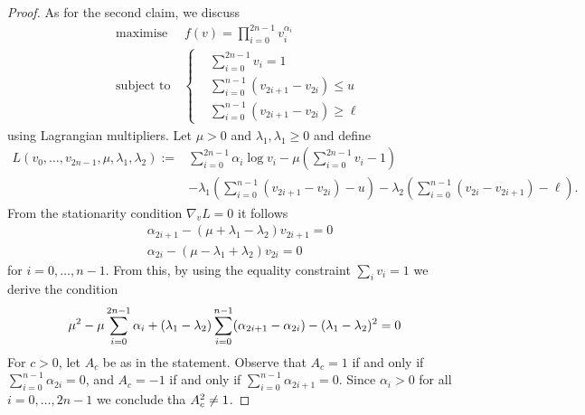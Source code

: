 \documentclass[10pt, article,table]{article}
\begin{document}
\begin{proof}
As for the second claim, we discuss 
\begin{equation*}
 \begin{split}
  &
  \text{maximise }\quad f(v)=\prod_{i=0}^{2n-1}v_{i}^{\alpha_i}
  \\
  &
  \text{subject to}\quad 
  \begin{cases}
   &
   \sum_{i=0}^{2n-1} v_i = 1
   \\
   &
   \sum_{i=0}^{n-1}(v_{2i+1}-v_{2i}) \leq u
   \\
   &
   \sum_{i=0}^{n-1}(v_{2i+1}-v_{2i}) \geq \ell
  \end{cases}
 \end{split}
\end{equation*}
using Lagrangian multipliers. Let $\mu > 0 $ and $\lambda_1, \lambda_1 \geq 0$ and define
\begin{equation*}
 \begin{split}
  L(v_0,\dots,v_{2n-1},\mu,\lambda_1,\lambda_2)
  :=
  &
  \sum_{i=0}^{2n-1} \alpha_{i}\log v_{i} - \mu \left(\sum_{i=0}^{2n-1} v_{i} -1\right)
  \\
  &
  -\lambda_1\left(\sum_{i=0}^{n-1}(v_{2i+1}-v_{2i}) - u\right)
  -\lambda_2\left(\sum_{i=0}^{n-1}(v_{2i}-v_{2i+1}) - \ell\right). 
 \end{split}
\end{equation*}
From the stationarity condition $\nabla_{v} L =0$ it follows
\begin{equation}\label{eq.conditionLagrangianPnt}
 \begin{split}
  &
  \alpha_{2i+1} - (\mu+\lambda_1 - \lambda_2)v_{2i+1} = 0
  \\
  &
  \alpha_{2i} - (\mu - \lambda_1 + \lambda_2)v_{2i} = 0
 \end{split}
\end{equation}
for $i=0,\dots,n-1$. From this, by using the equality constraint $\sum_i v_i = 1$ we derive the condition 
\begin{equation}\label{eq.conditionLagrangianMultipl}
 \mu\squared - \mu \sum_{i=0}^{2n-1}\alpha_i 
 +(\lambda_1-\lambda_2)\sum_{i=0}^{n-1}(\alpha_{2i+1}-\alpha_{2i})
 -(\lambda_1-\lambda_2)\squared=0
\end{equation}
For $c>0$, let $A_c$ be as in the statement. Observe that $A_c =1$ if and only if $\sum_{i=0}^{n-1}\alpha_{2i} =0$, and $A_c =-1$ if and only if $\sum_{i=0}^{n-1}\alpha_{2i+1} =0$. Since $\alpha_i>0$ for all $i=0,\dots,2n-1$ we conclude tha $A_c\squared \neq 1$. 


\end{proof}
\end{document}
